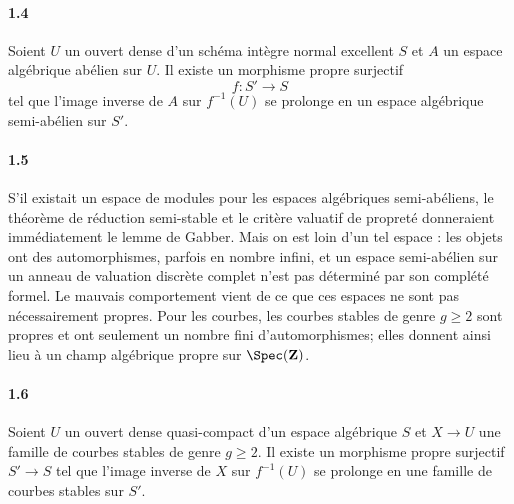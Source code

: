 \paragraph{1.4}
\begin{theorem}\label{thm:gabber-fr}
Soient $U$ un ouvert dense d'un schéma intègre normal excellent $S$ et $A$ un espace algébrique abélien sur $U$. Il existe un morphisme propre surjectif
\[
  f:S'\longrightarrow S
\]
tel que l'image inverse de $A$ sur $f^{-1}(U)$ se prolonge en un espace algébrique semi-abélien sur $S'$.
\end{theorem}

\paragraph{1.5}
S'il existait un espace de modules pour les espaces algébriques semi-abéliens, le théorème de réduction semi-stable et le critère valuatif de propreté donneraient immédiatement le lemme de Gabber. Mais on est loin d'un tel espace : les objets ont des automorphismes, parfois en nombre infini, et un espace semi-abélien sur un anneau de valuation discrète complet n'est pas déterminé par son complété formel. Le mauvais comportement vient de ce que ces espaces ne sont pas nécessairement propres. Pour les courbes, les courbes stables de genre $g\ge2$ sont propres et ont seulement un nombre fini d'automorphismes; elles donnent ainsi lieu à un champ algébrique propre sur $\Spec(\mathbf Z)$.

\paragraph{1.6}
\begin{lemma}\label{lem:stable-fr}
Soient $U$ un ouvert dense quasi-compact d'un espace algébrique $S$ et $X\to U$ une famille de courbes stables de genre $g\ge2$. Il existe un morphisme propre surjectif $S'\to S$ tel que l'image inverse de $X$ sur $f^{-1}(U)$ se prolonge en une famille de courbes stables sur $S'$.
\end{lemma}

